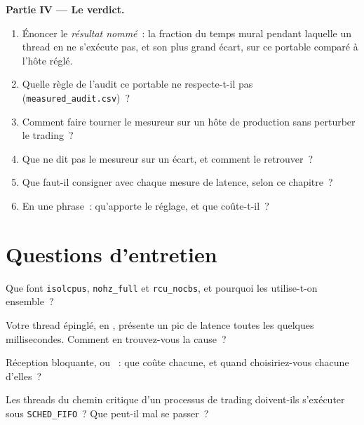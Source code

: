 \begin{problem}
\medskip\noindent\textbf{Partie IV --- Le verdict.}
\begin{enumerate}[resume]
\item Énoncer le \emph{résultat nommé}~: la fraction du temps mural pendant laquelle un thread en  ne s'exécute pas, et son plus grand écart, sur ce
portable comparé à l'hôte réglé.
\item Quelle règle de l'audit ce portable ne respecte-t-il pas (\texttt{measured\_audit.csv})~?
\item Comment faire tourner le mesureur sur un hôte de production sans perturber le trading~?
\item Que ne dit pas le mesureur sur un écart, et comment le retrouver~?
\item Que faut-il consigner avec chaque mesure de latence, selon ce chapitre~?
\item En une phrase~: qu'apporte le réglage, et que coûte-t-il~?
\end{enumerate}
\end{problem}

\section{Questions d'entretien}

\begin{interviewq}\label{iq:ll:linux-tuning:1}
Que font \texttt{isolcpus}, \texttt{nohz\_full} et \texttt{rcu\_nocbs}, et pourquoi les utilise-t-on ensemble~?
\end{interviewq}

\begin{interviewq}\label{iq:ll:linux-tuning:2}
Votre thread épinglé, en , présente un pic de latence toutes les quelques millisecondes. Comment en trouvez-vous la cause~?
\end{interviewq}

\begin{interviewq}\label{iq:ll:linux-tuning:3}
Réception bloquante,  ou ~: que coûte chacune, et quand choisiriez-vous chacune d'elles~?
\end{interviewq}

\begin{interviewq}\label{iq:ll:linux-tuning:4}
Les threads du chemin critique d'un processus de trading doivent-ils s'exécuter sous \texttt{SCHED\_FIFO}~? Que peut-il mal se passer~?
\end{interviewq}

